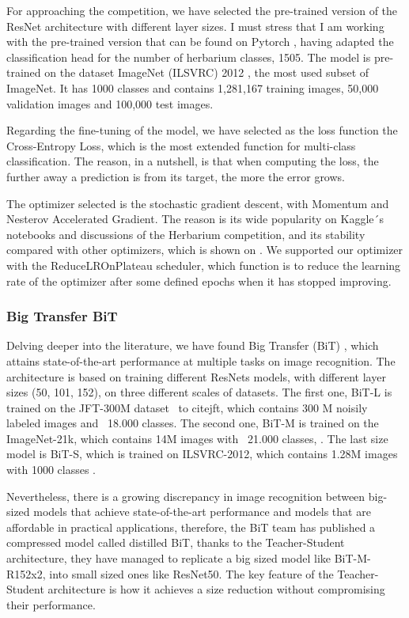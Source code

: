 \documentclass{article}
\begin{document}
For approaching the competition, we have selected the pre-trained version of the ResNet architecture with different layer sizes. I must stress that I am working with the pre-trained version that can be found on Pytorch \cite{pyresnet}, having adapted the classification head for the number of herbarium classes, 1505. The model is pre-trained on the dataset ImageNet (ILSVRC) 2012 \cite{Imagenet}, the most used subset of ImageNet. It has 1000  classes and contains 1,281,167 training images, 50,000 validation images and 100,000 test images.

Regarding the fine-tuning of the model, we have selected as the loss function the Cross-Entropy Loss, which is the most extended function for multi-class classification. The reason, in a nutshell, is that when computing the loss, the further away a prediction is from its target, the more the error grows.

The optimizer selected is the stochastic gradient descent, with Momentum and Nesterov Accelerated Gradient. The reason is its wide popularity on Kaggle´s notebooks and discussions of the Herbarium competition, and its stability compared with other optimizers, which is shown on \cite{sgd}. We supported our optimizer with the ReduceLROnPlateau scheduler, which function is to reduce the learning rate of the optimizer after some defined epochs when it has stopped improving.


\subsubsection{Big Transfer BiT}
Delving deeper into the literature, we have found Big Transfer (BiT) \cite{bit}, which attains state-of-the-art performance at multiple tasks on image recognition. The architecture is based on training different ResNets models, with different layer sizes (50, 101, 152), on three different scales of datasets. The first one, BiT-L is trained on the JFT-300M dataset \ to cite{jft}, which contains 300 M noisily labeled images and ~18.000 classes. The second one, BiT-M is trained on the  ImageNet-21k, which contains 14M images with ~21.000 classes, \cite{Imagenet}. The last size model is BiT-S, which is trained on ILSVRC-2012, which contains 1.28M images with 1000 classes \cite{Imagenet}.

Nevertheless, there is a growing discrepancy in image recognition between big-sized models that achieve state-of-the-art performance and models that are affordable in practical applications, therefore, the BiT team has published a compressed model called distilled BiT, thanks to the Teacher-Student architecture, they have managed to replicate a big sized model like BiT-M-R152x2, into small sized ones like ResNet50. The key feature of the Teacher-Student architecture is how it achieves a size reduction without compromising their performance.
\end{document}

